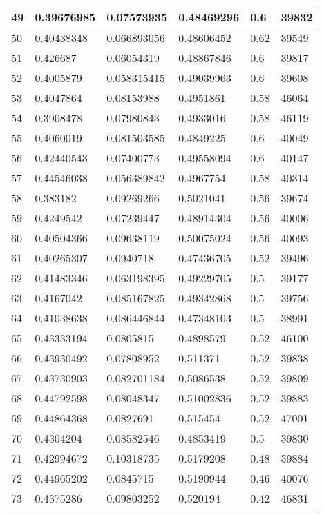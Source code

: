 \begin{longtable}{|l|l|l|l|l|l|}
49 & 0.39676985 & 0.07573935 & 0.48469296 & 0.6 & 39832 \\ \hline 
50 & 0.40438348 & 0.066893056 & 0.48606452 & 0.62 & 39549 \\ \hline 
51 & 0.426687 & 0.06054319 & 0.48867846 & 0.6 & 39817 \\ \hline 
52 & 0.4005879 & 0.058315415 & 0.49039963 & 0.6 & 39608 \\ \hline 
53 & 0.4047864 & 0.08153988 & 0.4951861 & 0.58 & 46064 \\ \hline 
54 & 0.3908478 & 0.07980843 & 0.4933016 & 0.58 & 46119 \\ \hline 
55 & 0.4060019 & 0.081503585 & 0.4849225 & 0.6 & 40049 \\ \hline 
56 & 0.42440543 & 0.07400773 & 0.49558094 & 0.6 & 40147 \\ \hline 
57 & 0.44546038 & 0.056389842 & 0.4967754 & 0.58 & 40314 \\ \hline 
58 & 0.383182 & 0.09269266 & 0.5021041 & 0.56 & 39674 \\ \hline 
59 & 0.4249542 & 0.07239447 & 0.48914304 & 0.56 & 40006 \\ \hline 
60 & 0.40504366 & 0.09638119 & 0.50075024 & 0.56 & 40093 \\ \hline 
61 & 0.40265307 & 0.0940718 & 0.47436705 & 0.52 & 39496 \\ \hline 
62 & 0.41483346 & 0.063198395 & 0.49229705 & 0.5 & 39177 \\ \hline 
63 & 0.4167042 & 0.085167825 & 0.49342868 & 0.5 & 39756 \\ \hline 
64 & 0.41038638 & 0.086446844 & 0.47348103 & 0.5 & 38991 \\ \hline 
65 & 0.43333194 & 0.0805815 & 0.4898579 & 0.52 & 46100 \\ \hline 
66 & 0.43930492 & 0.07808952 & 0.511371 & 0.52 & 39838 \\ \hline 
67 & 0.43730903 & 0.082701184 & 0.5086538 & 0.52 & 39809 \\ \hline 
68 & 0.44792598 & 0.08048347 & 0.51002836 & 0.52 & 39883 \\ \hline 
69 & 0.44864368 & 0.0827691 & 0.515454 & 0.52 & 47001 \\ \hline 
70 & 0.4304204 & 0.08582546 & 0.4853419 & 0.5 & 39830 \\ \hline 
71 & 0.42994672 & 0.10318735 & 0.5179208 & 0.48 & 39884 \\ \hline 
72 & 0.44965202 & 0.0845715 & 0.5190944 & 0.46 & 40076 \\ \hline 
73 & 0.4375286 & 0.09803252 & 0.520194 & 0.42 & 46831 \\ \hline 

\end{longtable}
